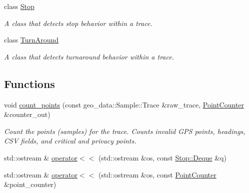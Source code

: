 \begin{DoxyCompactItemize}
class \hyperlink{classcvdi_1_1Stop}{Stop}
\begin{DoxyCompactList}\small\item\em A class that detects stop behavior within a trace. \end{DoxyCompactList}\item 
class \hyperlink{classcvdi_1_1TurnAround}{Turn\+Around}
\begin{DoxyCompactList}\small\item\em A class that detects turnaround behavior within a trace. \end{DoxyCompactList}\end{DoxyCompactItemize}
\subsection*{Functions}
\begin{DoxyCompactItemize}
\item 
void \hyperlink{namespacecvdi_a94bb499641f7ef65cc27480323ff679c}{count\+\_\+points} (const geo\+\_\+data\+::\+Sample\+::\+Trace \&raw\+\_\+trace, \hyperlink{structcvdi_1_1PointCounter}{Point\+Counter} \&counter\+\_\+out)
\begin{DoxyCompactList}\small\item\em Count the points (samples) for the trace. Counts invalid G\+PS points, headings, C\+SV fields, and critical and privacy points. \end{DoxyCompactList}\item 
std\+::ostream \& \hyperlink{namespacecvdi_a6667f0eb4ecabc10d863886583887aba}{operator$<$$<$} (std\+::ostream \&os, const \hyperlink{classcvdi_1_1Stop_1_1Deque}{Stop\+::\+Deque} \&q)
\item 
std\+::ostream \& \hyperlink{namespacecvdi_ab68079d0fc81108c9b4e7dbfe12a2867}{operator$<$$<$} (std\+::ostream \&os, const \hyperlink{structcvdi_1_1PointCounter}{Point\+Counter} \&point\+\_\+counter)
\end{DoxyCompactItemize}
